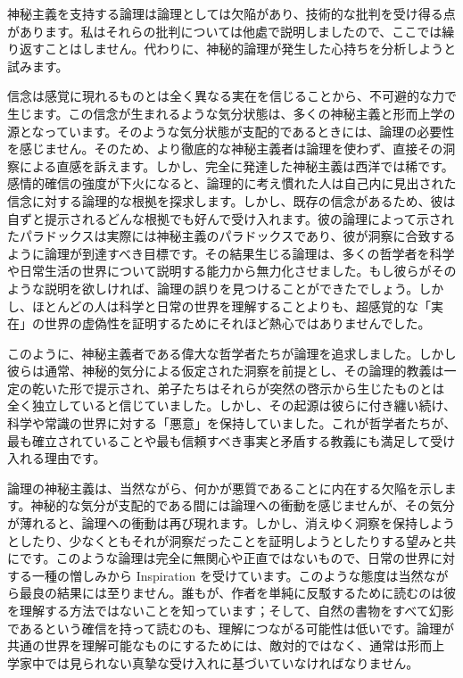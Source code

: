 \documentclass[a4paper,11pt,openany]{ltjsbook}
\begin{document}
神秘主義を支持する論理は論理としては欠陥があり、技術的な批判を受け得る点があります。私はそれらの批判については他處で説明しましたので、ここでは繰り返すことはしません。代わりに、神秘的論理が発生した心持ちを分析しようと試みます。

信念は感覚に現れるものとは全く異なる実在を信じることから、不可避的な力で生じます。この信念が生まれるような気分状態は、多くの神秘主義と形而上学の源となっています。そのような気分状態が支配的であるときには、論理の必要性を感じません。そのため、より徹底的な神秘主義者は論理を使わず、直接その洞察による直感を訴えます。しかし、完全に発達した神秘主義は西洋では稀です。感情的確信の強度が下火になると、論理的に考え慣れた人は自己内に見出された信念に対する論理的な根拠を探求します。しかし、既存の信念があるため、彼は自ずと提示されるどんな根拠でも好んで受け入れます。彼の論理によって示されたパラドックスは実際には神秘主義のパラドックスであり、彼が洞察に合致するように論理が到達すべき目標です。その結果生じる論理は、多くの哲学者を科学や日常生活の世界について説明する能力から無力化させました。もし彼らがそのような説明を欲しければ、論理の誤りを見つけることができたでしょう。しかし、ほとんどの人は科学と日常の世界を理解することよりも、超感覚的な「実在」の世界の虚偽性を証明するためにそれほど熱心ではありませんでした。

このように、神秘主義者である偉大な哲学者たちが論理を追求しました。しかし彼らは通常、神秘的気分による仮定された洞察を前提とし、その論理的教義は一定の乾いた形で提示され、弟子たちはそれらが突然の啓示から生じたものとは全く独立していると信じていました。しかし、その起源は彼らに付き纏い続け、科学や常識の世界に対する「悪意」を保持していました。これが哲学者たちが、最も確立されていることや最も信頼すべき事実と矛盾する教義にも満足して受け入れる理由です。


論理の神秘主義は、当然ながら、何かが悪質であることに内在する欠陥を示します。神秘的な気分が支配的である間には論理への衝動を感じませんが、その気分が薄れると、論理への衝動は再び現れます。しかし、消えゆく洞察を保持しようとしたり、少なくともそれが洞察だったことを証明しようとしたりする望みと共にです。このような論理は完全に無関心や正直ではないもので、日常の世界に対する一種の憎しみから Inspiration を受けています。このような態度は当然ながら最良の結果には至りません。誰もが、作者を単純に反駁するために読むのは彼を理解する方法ではないことを知っています；そして、自然の書物をすべて幻影であるという確信を持って読むのも、理解につながる可能性は低いです。論理が共通の世界を理解可能なものにするためには、敵対的ではなく、通常は形而上学家中では見られない真摯な受け入れに基づいていなければなりません。
\end{document}
